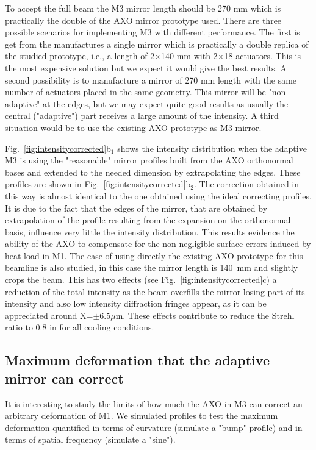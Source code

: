 \documentclass[]{spie}  %
\begin{document}
To accept the full beam the M3 mirror length should be 270 mm which is practically the double of the AXO mirror prototype used. There are three possible scenarios for implementing M3 with different performance. The first is get from the manufactures a single mirror which is practically a double replica of the studied prototype, i.e., a length of 2$\times$140 mm with 2$\times$18 actuators. This is the most expensive solution but we expect it would give the best results. A second possibility is to manufacture a mirror of 270 mm length with the same number of actuators placed in the same geometry. This mirror will be "non-adaptive" at the edges, but we may expect quite good results as usually the central ("adaptive") part receives a large amount of the intensity. A third situation would be to use the existing AXO prototype as M3 mirror.  

Fig.~\ref{fig:intensitycorrected}b$_1$ shows the intensity distribution when the adaptive M3 is using the "reasonable" mirror profiles built from the AXO orthonormal bases and extended to the needed dimension by extrapolating the edges. These profiles are shown in Fig.~\ref{fig:intensitycorrected}b$_2$. The correction obtained in this way is almost identical to the one obtained using the ideal correcting profiles. It is due to the fact that the edges of the mirror, that are obtained by extrapolation of the profile resulting from the expansion on the orthonormal basis, influence very little the intensity distribution. This results evidence the ability of the AXO to compensate for the non-negligible surface errors induced by heat load in M1. The case of using directly the existing AXO prototype for this beamline is also studied, in this case the mirror length is 140~mm and slightly crops the beam. This has two effects (see Fig.~\ref{fig:intensitycorrected}c) a reduction of the total intensity as the beam overfills the mirror losing part of its intensity and also low intensity diffraction fringes appear, as it can be appreciated around X=$\pm6.5\mu$m. These effects contribute to reduce the Strehl ratio to 0.8 in for all cooling conditions.


\subsection{Maximum deformation that the adaptive mirror can correct}

It is interesting to study the limits of how much the AXO in M3 can correct an arbitrary deformation of M1. We simulated profiles to test the maximum deformation quantified in terms of curvature (simulate a "bump" profile) and in terms of spatial frequency (simulate a "sine"). 
\end{document}
